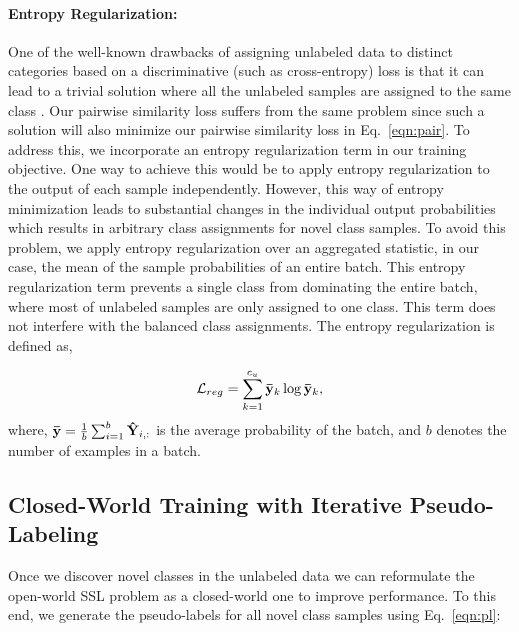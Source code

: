 \documentclass[runningheads]{eccv2022submission}
\begin{document}
\vspace{-4mm}
\paragraph{\textbf{Entropy Regularization:}}
\label{par:entropy}
One of the well-known drawbacks of assigning unlabeled data to distinct categories based on a discriminative (such as cross-entropy) loss is that it can lead to a trivial solution where all the unlabeled samples are assigned to the same class \cite{YM.2020Self-labelling,caron2018deep,cao2022openworld,fini2021unified}. Our pairwise similarity loss suffers from the same problem since such a solution will also minimize our pairwise similarity loss in Eq.~\ref{eqn:pair}. To address this, we incorporate an entropy regularization term in our training objective. One way to achieve this would be to apply entropy regularization to the output of each sample independently. However, this way of entropy minimization leads to substantial changes in the individual output probabilities which results in arbitrary class assignments for novel class samples. To avoid this problem, we apply entropy regularization over an aggregated statistic, in our case, the mean of the sample probabilities of an entire batch. This entropy regularization term prevents a single class from dominating the entire batch, where most of unlabeled samples are only assigned to one class. This term does not interfere with the balanced class assignments. 
The entropy regularization is defined as, 

\begin{align}
    \label{eqn:reg}
\mathcal{L}_{reg} = \sum_{k=1}^{c_u}\mathbf{\Bar{y}}_{k}\log\mathbf{\Bar{y}}_{k},
\end{align}
where, $\mathbf{\Bar{y}} = \frac{1}{b} \sum_{i=1}^{b}\mathbf{\hat{Y}}_{i,:}$ is the average probability of the batch, and $b$ denotes the number of examples in a batch.




\vspace{-2mm}
\subsection{Closed-World Training with Iterative Pseudo-Labeling}
\label{sec:ipl}
\vspace{-2mm}
 
Once we discover novel classes in the unlabeled data we can reformulate the open-world SSL problem as a closed-world one to improve performance. To this end, we generate the pseudo-labels for all novel class samples using Eq.~\ref{eqn:pl}:
\end{document}
